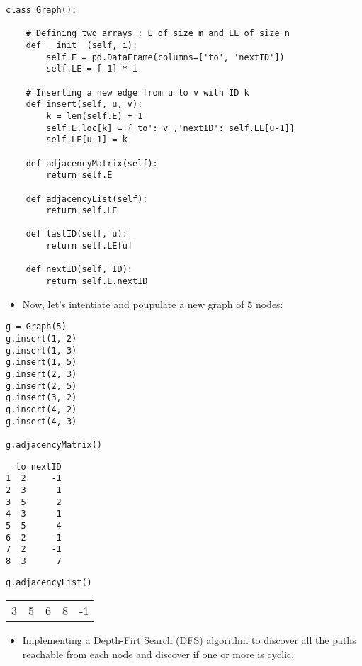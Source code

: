 \documentclass[11pt]{article}
\begin{document}
\begin{verbatim}
class Graph():
    
    # Defining two arrays : E of size m and LE of size n
    def __init__(self, i):
        self.E = pd.DataFrame(columns=['to', 'nextID'])
        self.LE = [-1] * i
        
    # Inserting a new edge from u to v with ID k
    def insert(self, u, v):
        k = len(self.E) + 1
        self.E.loc[k] = {'to': v ,'nextID': self.LE[u-1]}
        self.LE[u-1] = k
        
    def adjacencyMatrix(self):
        return self.E
    
    def adjacencyList(self):
        return self.LE

    def lastID(self, u):
        return self.LE[u]

    def nextID(self, ID):
        return self.E.nextID

\end{verbatim}

\begin{itemize}
\item Now, let's intentiate and poupulate a new graph of 5 nodes:
\end{itemize}

\begin{verbatim}
g = Graph(5)
g.insert(1, 2)
g.insert(1, 3)
g.insert(1, 5)
g.insert(2, 3)
g.insert(2, 5)
g.insert(3, 2)
g.insert(4, 2)
g.insert(4, 3)

g.adjacencyMatrix()
\end{verbatim}

\begin{verbatim}
  to nextID
1  2     -1
2  3      1
3  5      2
4  3     -1
5  5      4
6  2     -1
7  2     -1
8  3      7
\end{verbatim}


\begin{verbatim}
g.adjacencyList()
\end{verbatim}

\begin{center}
\begin{tabular}{rrrrr}
3 & 5 & 6 & 8 & -1\\
\end{tabular}
\end{center}

\begin{itemize}
\item Implementing a Depth-Firt Search (DFS) algorithm to discover all the paths reachable from
each node and discover if one or more is cyclic.
\end{itemize}
\end{document}
